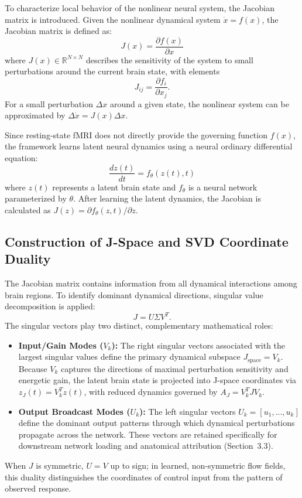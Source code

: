 \documentclass{article}
\begin{document}
To characterize local behavior of the nonlinear neural system, the Jacobian matrix is introduced. Given the nonlinear dynamical system $\dot{x}=f(x)$, the Jacobian matrix is defined as:
\begin{equation}
J(x)=\frac{\partial f(x)}{\partial x}
\end{equation}
where $J(x)\in \mathbb{R}^{N\times N}$ describes the sensitivity of the system to small perturbations around the current brain state, with elements
\begin{equation}
J_{ij}=\frac{\partial f_i}{\partial x_j}.
\end{equation}
For a small perturbation $\Delta x$ around a given state, the nonlinear system can be approximated by $\Delta\dot{x}=J(x)\Delta x$.

Since resting-state fMRI does not directly provide the governing function $f(x)$, the framework learns latent neural dynamics using a neural ordinary differential equation:
\begin{equation}
\frac{dz(t)}{dt}=f_{\theta}(z(t),t)
\end{equation}
where $z(t)$ represents a latent brain state and $f_{\theta}$ is a neural network parameterized by $\theta$. After learning the latent dynamics, the Jacobian is calculated as $J(z)=\partial f_{\theta}(z,t)/\partial z$.

\subsection{Construction of J-Space and SVD Coordinate Duality}

The Jacobian matrix contains information from all dynamical interactions among brain regions. To identify dominant dynamical directions, singular value decomposition is applied:
\begin{equation}
J=U\Sigma V^T.
\end{equation}
The singular vectors play two distinct, complementary mathematical roles:
\begin{itemize}
\item \textbf{Input/Gain Modes ($V_k$):} The right singular vectors associated with the largest singular values define the primary dynamical subspace $J_{\mathrm{space}}=V_k$. Because $V_k$ captures the directions of maximal perturbation sensitivity and energetic gain, the latent brain state is projected into J-space coordinates via $z_J(t) = V_k^T z(t)$, with reduced dynamics governed by $A_J = V_k^T J V_k$.
\item \textbf{Output Broadcast Modes ($U_k$):} The left singular vectors $U_k = [u_1, \ldots, u_k]$ define the dominant output patterns through which dynamical perturbations propagate across the network. These vectors are retained specifically for downstream network loading and anatomical attribution (Section~3.3).
\end{itemize}
When $J$ is symmetric, $U = V$ up to sign; in learned, non-symmetric flow fields, this duality distinguishes the coordinates of control input from the pattern of observed response.
\end{document}
